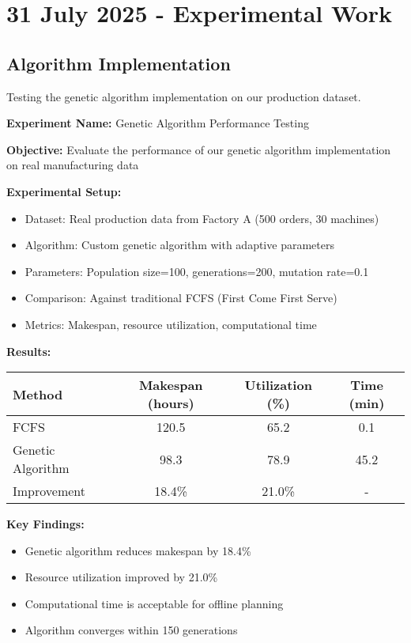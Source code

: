 \documentclass[12pt,a4paper,twoside]{article}
\begin{document}

\section{31 July 2025 - Experimental Work}

\subsection{Algorithm Implementation}
Testing the genetic algorithm implementation on our production dataset.

\begin{experiment}
\textbf{Experiment Name:} Genetic Algorithm Performance Testing

\textbf{Objective:}
Evaluate the performance of our genetic algorithm implementation on real manufacturing data

\textbf{Experimental Setup:}
\begin{itemize}
    \item Dataset: Real production data from Factory A (500 orders, 30 machines)
    \item Algorithm: Custom genetic algorithm with adaptive parameters
    \item Parameters: Population size=100, generations=200, mutation rate=0.1
    \item Comparison: Against traditional FCFS (First Come First Serve)
    \item Metrics: Makespan, resource utilization, computational time
\end{itemize}

\textbf{Results:}
\begin{center}
\begin{tabular}{@{}lccc@{}}
\toprule
\textbf{Method} & \textbf{Makespan (hours)} & \textbf{Utilization (\%)} & \textbf{Time (min)} \\
\midrule
FCFS & 120.5 & 65.2 & 0.1 \\
Genetic Algorithm & 98.3 & 78.9 & 45.2 \\
Improvement & 18.4\% & 21.0\% & - \\
\bottomrule
\end{tabular}
\end{center}

\textbf{Key Findings:}
\begin{itemize}
    \item Genetic algorithm reduces makespan by 18.4\%
    \item Resource utilization improved by 21.0\%
    \item Computational time is acceptable for offline planning
    \item Algorithm converges within 150 generations
\end{itemize}


\end{experiment}
\end{document}
